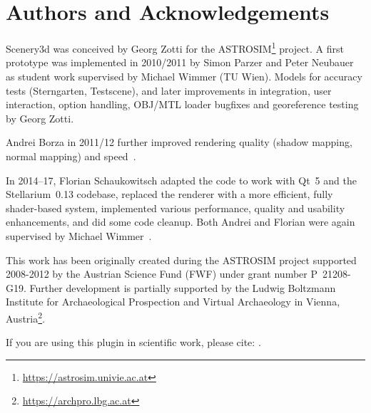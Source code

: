 \section*{Authors and Acknowledgements}
\label{sec:scenery3d:Acknowledgments}


Scenery3d was conceived by Georg Zotti for the
ASTROSIM\footnote{\url{https://astrosim.univie.ac.at}} project. A first
prototype was implemented in 2010/2011 by Simon Parzer and
Peter Neubauer as student work supervised by Michael Wimmer (TU Wien).
Models for accuracy tests (Sterngarten, Testscene), and later
improvements in integration, user interaction,  option handling,
OBJ/MTL loader bugfixes and georeference testing by Georg Zotti.

Andrei Borza in 2011/12 further improved rendering quality (shadow
mapping, normal mapping) and
speed~\citep{Zotti-Neubauer:VSMM2012,Zotti-Neubauer:EuroMed2012,Zotti:2012:SpringerAA}.

In 2014--17,
Florian Schaukowitsch adapted the code to work with Qt~5 and the 
Stellarium~0.13 codebase, replaced the renderer with a more efficient, fully
shader-based system, implemented various performance, quality and usability
enhancements, and did some code cleanup. Both Andrei and Florian were again
supervised by Michael Wimmer~\citep{Zotti:CHNT2015,Zotti:SEAC2015,Zotti:SEAC2017}.

This work has been originally created during the ASTROSIM project supported 2008-2012 by
the Austrian Science Fund (FWF) under grant number P~21208-G19. Further development is
partially supported by the Ludwig Boltzmann Institute for Archaeological Prospection and Virtual Archaeology in Vienna, Austria\footnote{%
  \url{https://archpro.lbg.ac.at}}.

If you are using this plugin in scientific work, please cite: \citep{Zotti:CHNT2015,Zotti:SEAC2015,Zotti:SEAC2017,Zotti-etal:SIA2016,Zotti:TAG2016,Zotti-etal:JSA2020.6.2}.



